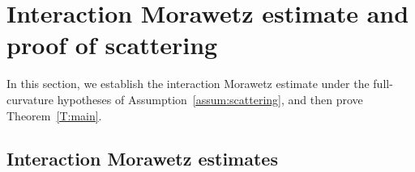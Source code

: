 \documentclass[10pt%
]{amsart}
\numberwithin{equation}{section}
\newcommand{\R}{\mathbb{R}}
\theoremstyle{definition}
\begin{document}
%
%
%









\section{Interaction Morawetz estimate and proof of scattering}\label{sec:intMor}

In this section, we establish the interaction Morawetz estimate under the full-curvature hypotheses of Assumption~\ref{assum:scattering}, and then prove Theorem~\ref{T:main}.

\subsection{Interaction Morawetz estimates}	
\end{document}
